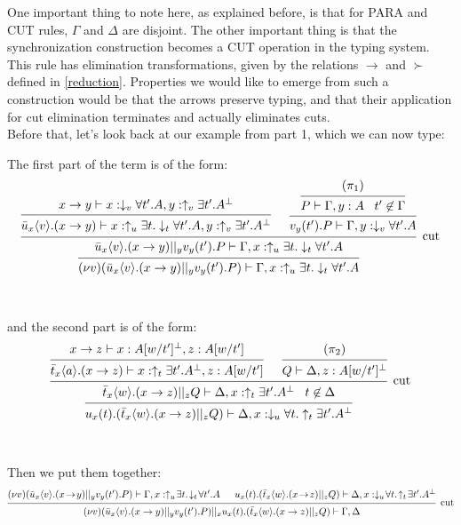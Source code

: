 One important thing to note here, as explained before, is that for PARA and CUT rules, $\Gamma$ and $\Delta$ are disjoint. The other important thing is that the synchronization construction becomes a CUT operation in the typing system. This rule has elimination transformations, given by the relations $\to$ and $\succ$ defined in \ref{reduction}. Properties we would like to emerge from such a construction would be that the arrows preserve typing, and that their application for cut elimination terminates and actually eliminates cuts.\\
Before that, let's look back at our example from part 1, which we can now type:

\example The first part of the term is of the form:
\[\begin{prooftree}
				\hypo{x\to y \vdash x:\downarrow_v\forall t'.A, y:\uparrow_v\exists t'.A^\bot}
			\infer1{\bar{u}_x\langle v\rangle.(x\to y) \vdash x:\uparrow_u\exists t.\downarrow_t\forall t'.A, y:\uparrow_v\exists t'.A^\bot}
					\hypo{(\pi_1)}
				\infer1{P \vdash \Gamma, y:A\;\;\; t' \not\in \Gamma}
			\infer1{v_y(t').P \vdash \Gamma, y:\downarrow_v\forall t'.A}
		\infer2[cut]{\bar{u}_x\langle v\rangle.(x\to y) ||_y v_y(t').P \vdash \Gamma, x:\uparrow_u\exists t.\downarrow_t\forall t'.A}
	\infer1{(\nu v)(\bar{u}_x\langle v\rangle.(x\to y) ||_y v_y(t').P) \vdash \Gamma, x:\uparrow_u\exists t.\downarrow_t\forall t'.A}
\end{prooftree}\]
~\\~\\
and the second part is of the form:
\[\begin{prooftree}
				\hypo{x\to z \vdash x:A[w/t']^\bot, z:A[w/t']}
			\infer1{\bar{t}_x\langle a\rangle.(x\to z) \vdash x:\uparrow_t\exists t'.A^\bot, z:A[w/t']}
				\hypo{(\pi_2)}
			\infer1{Q \vdash \Delta, z:A[w/t']^\bot}
		\infer2[cut]{\bar{t}_x\langle w\rangle.(x\to z) ||_z Q \vdash \Delta, x:\uparrow_t\exists t'.A^\bot\;\;\; t\not\in \Delta}
	\infer1{u_x(t).(\bar{t}_x\langle w\rangle.(x\to z) ||_z Q) \vdash \Delta, x:\downarrow_u\forall t.\uparrow_t\exists t'.A^\bot}
\end{prooftree}\]
~\\~\\
Then we put them together:
\[\begin{prooftree}
		\hypo{(\nu v)(\bar{u}_x\langle v\rangle.(x\!\to\! y) ||_y v_y(t').P) \vdash \Gamma, x:\uparrow_u\!\exists t.\!\downarrow_t\!\forall t'.A}
		\hypo{u_x(t).(\bar{t}_x\langle w\rangle.(x\!\to\! z) ||_z Q) \vdash \Delta, x:\downarrow_u\!\forall t.\!\uparrow_t\!\exists t'.A^\bot}
	\infer2[cut]{(\nu v)(\bar{u}_x\langle v\rangle.(x\to y) ||_y v_y(t').P) ||_x u_x(t).(\bar{t}_x\langle w\rangle.(x\to z) ||_z Q) \vdash \Gamma, \Delta}
\end{prooftree}\]

